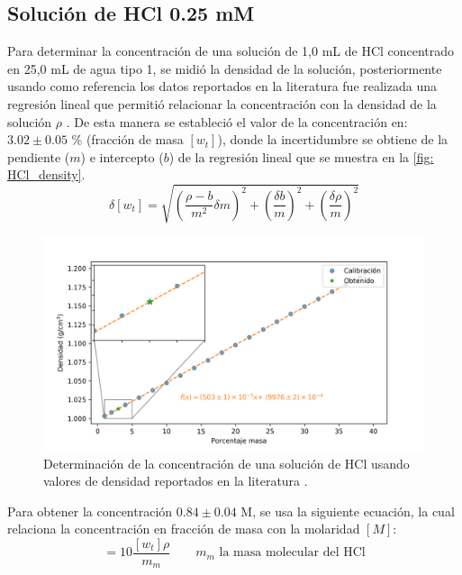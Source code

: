 	\subsection{Soluci\'on de HCl 0.25 mM}
		Para determinar la concentraci\'on de una soluci\'on de 1,0 mL de HCl concentrado en 25,0 mL de agua tipo 1, se midi\'o la densidad de la soluci\'on, posteriormente usando como referencia los datos reportados en la literatura fue realizada una regresi\'on lineal que permiti\'o relacionar la concentraci\'on con la densidad de la soluci\'on $\rho$ \cite{perry2007perry}. De esta manera se estableci\'o el valor de la concentraci\'on en: $3.02 \pm 0.05$ \% (fracci\'on de masa $[w_t]$), donde la incertidumbre se obtiene de la pendiente ($m$) e intercepto ($b$) de la regresi\'on lineal que se muestra en la \autoref{fig: HCl_density}.
		\begin{equation}
			\delta [w_t] = \sqrt{\left(\dfrac{\rho-b}{m^2}\delta m\right)^2 + \left(\dfrac{\delta b}{m}\right)^2 + \left(\dfrac{\delta \rho}{m}\right)^2}
		\end{equation}
		\begin{figure}[h]
			\centering
			\includegraphics[width=\linewidth]{../Data/Concentration/C_HCl_initial.png}
			\caption{Determinaci\'on de la concentraci\'on de una soluci\'on de HCl usando valores de densidad reportados en la literatura \cite{perry2007perry}.}
			\label{fig: HCl_density}
		\end{figure}
		
		Para obtener la concentraci\'on $0.84 \pm 0.04$ M, se usa la siguiente ecuaci\'on, la cual relaciona la concentraci\'on en fracci\'on de masa con la molaridad $[M]$:
		\begin{equation}
			[M] = 10\dfrac{[w_t]\rho}{m_m} \qquad \text{$m_m$ la masa molecular del HCl}
		\end{equation}
		
